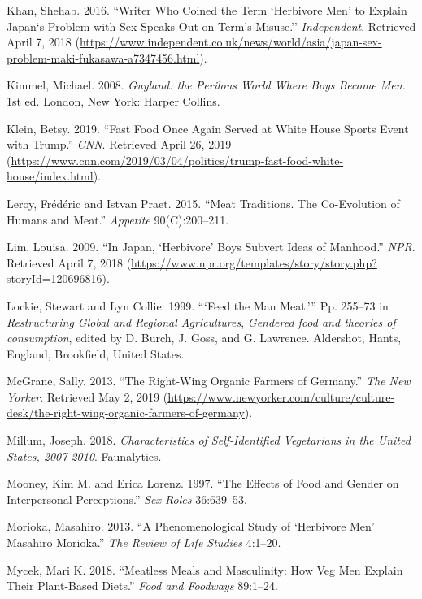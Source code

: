 \documentclass[twoside]{report}
\begin{document}
\hypertarget{khan}{Khan, Shehab. 2016. ``Writer Who Coined the Term `Herbivore Men' to
Explain Japan`s Problem with Sex Speaks Out on Term's Misuse.''
\emph{Independent}. Retrieved April 7, 2018
(\url{https://www.independent.co.uk/news/world/asia/japan-sex-problem-maki-fukasawa-a7347456.html}).}

\hypertarget{kimmel}{Kimmel, Michael. 2008. \emph{Guyland: the Perilous World Where Boys
Become Men}. 1st ed. London, New York: Harper Collins.}

\hypertarget{klein}{Klein, Betsy. 2019. ``Fast Food Once Again Served at White House Sports
Event with Trump.'' \emph{CNN}. Retrieved April 26, 2019
(\url{https://www.cnn.com/2019/03/04/politics/trump-fast-food-white-house/index.html}).}

\hypertarget{leroy}{Leroy, Frédéric and Istvan Praet. 2015. ``Meat Traditions. The Co-Evolution of Humans and Meat.'' \emph{Appetite} 90(C):200--211.}

\hypertarget{lim}{Lim, Louisa. 2009. ``In Japan, `Herbivore' Boys Subvert Ideas of
Manhood.'' \emph{NPR}. Retrieved April 7, 2018
(\url{https://www.npr.org/templates/story/story.php?storyId=120696816}).}

\hypertarget{lockie}{Lockie, Stewart and Lyn Collie. 1999. ```Feed the Man Meat.''' Pp.
255--73 in \emph{Restructuring Global and Regional Agricultures},
\emph{Gendered food and theories of consumption}, edited by D. Burch, J.
Goss, and G. Lawrence. Aldershot, Hants, England, Brookfield, United
States.}

\hypertarget{mcgrane}{McGrane, Sally. 2013. ``The Right-Wing Organic Farmers of Germany.''
\emph{The New Yorker}. Retrieved May 2, 2019
(\url{https://www.newyorker.com/culture/culture-desk/the-right-wing-organic-farmers-of-germany}).}

\hypertarget{millum}{Millum, Joseph. 2018. \emph{Characteristics of Self-Identified
Vegetarians in the United States, 2007-2010}. Faunalytics.}
\pagebreak

\hypertarget{mooney}{Mooney, Kim M. and Erica Lorenz. 1997. ``The Effects of Food and Gender on Interpersonal Perceptions.'' \emph{Sex Roles} 36:639--53.}

\hypertarget{morioka}{Morioka, Masahiro. 2013. ``A Phenomenological Study of `Herbivore Men'
Masahiro Morioka.'' \emph{The Review of Life Studies} 4:1--20.}

\hypertarget{mycek}{Mycek, Mari K. 2018. ``Meatless Meals and Masculinity: How Veg Men
Explain Their Plant-Based Diets.'' \emph{Food and Foodways} 89:1--24.}
\end{document}
